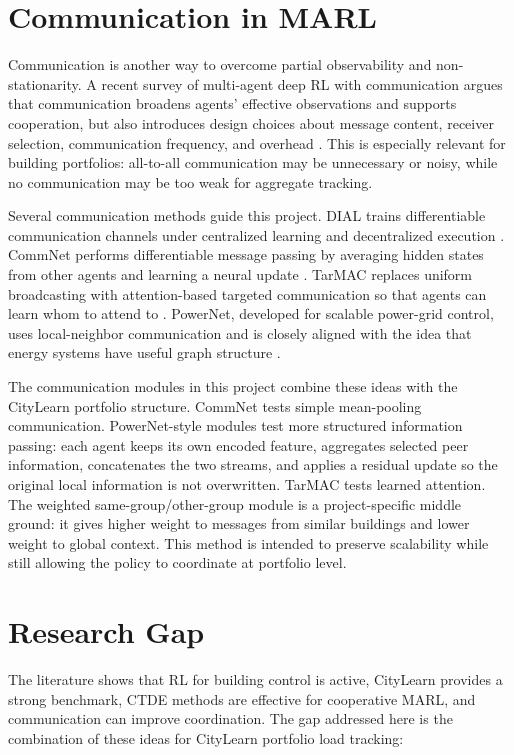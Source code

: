\section{Communication in MARL}

Communication is another way to overcome partial observability and
non-stationarity. A recent survey of multi-agent deep RL with communication
argues that communication broadens agents' effective observations and supports
cooperation, but also introduces design choices about message content, receiver
selection, communication frequency, and overhead \cite{commSurvey2024}. This is
especially relevant for building portfolios: all-to-all communication may be
unnecessary or noisy, while no communication may be too weak for aggregate
tracking.

Several communication methods guide this project. DIAL trains differentiable
communication channels under centralized learning and decentralized execution
\cite{dial2016}. CommNet performs differentiable message passing by averaging
hidden states from other agents and learning a neural update
\cite{commnet2016}. TarMAC replaces uniform broadcasting with attention-based
targeted communication so that agents can learn whom to attend to
\cite{tarmac2019}. PowerNet, developed for scalable power-grid control, uses
local-neighbor communication and is closely aligned with the idea that energy
systems have useful graph structure \cite{powernet2020}.

The communication modules in this project combine these ideas with the
CityLearn portfolio structure. CommNet tests simple mean-pooling communication.
PowerNet-style modules test more structured information passing: each agent
keeps its own encoded feature, aggregates selected peer information, concatenates
the two streams, and applies a residual update so the original local information
is not overwritten. TarMAC tests learned attention. The weighted
same-group/other-group module is a project-specific middle ground: it gives
higher weight to messages from similar buildings and lower weight to global
context. This method is intended to preserve scalability while still allowing
the policy to coordinate at portfolio level.

\section{Research Gap}

The literature shows that RL for building control is active, CityLearn provides
a strong benchmark, CTDE methods are effective for cooperative MARL, and
communication can improve coordination. The gap addressed here is the
combination of these ideas for CityLearn portfolio load tracking:

